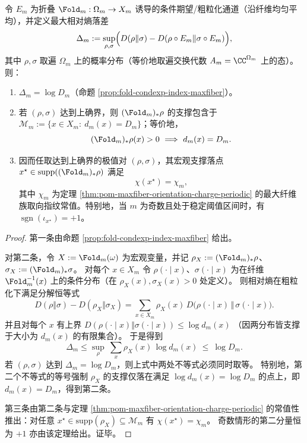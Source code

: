 \begin{theorem}\label{thm:fold-max-data-processing-saturation-chi}
令 \(E_m\) 为折叠 \(\Fold_m:\Omega_m\to X_m\) 诱导的条件期望/粗粒化通道（沿纤维均匀平均），并定义最大相对熵落差
\[
\Delta_m:=\sup_{\rho,\sigma}\Bigl(D(\rho\Vert\sigma)-D(\rho\circ E_m\Vert\sigma\circ E_m)\Bigr),
\]
其中 \(\rho,\sigma\) 取遍 \(\Omega_m\) 上的概率分布（等价地取遍交换代数 \(A_m=\CC^{\Omega_m}\) 上的态）。
则：
\begin{enumerate}
\normalfont
  \item \(\Delta_m=\log D_m\)（命题 \ref{prop:fold-condexp-index-maxfiber}）。
  \item 若 \((\rho,\sigma)\) 达到上确界，则 \((\Fold_m)_\ast\rho\) 的支撑包含于 \(\mathcal{M}_m:=\{x\in X_m:\ d_m(x)=D_m\}\)；等价地，
  \[
  (\Fold_m)_\ast\rho(x)>0\ \Longrightarrow\ d_m(x)=D_m.
  \]
  \item 因而任取达到上确界的极值对 \((\rho,\sigma)\)，其宏观支撑落点 \(x^\star\in \mathrm{supp}((\Fold_m)_\ast\rho)\) 满足
  \[
  \chi(x^\star)=\chi_m,
  \]
  其中 \(\chi_m\) 为定理 \ref{thm:pom-maxfiber-orientation-charge-periodic} 的最大纤维族取向指纹常值。特别地，当 \(m\) 为奇数且处于稳定阈值区间时，有 \(\operatorname{sgn}(\iota_{x^\star})=+1\)。
\end{enumerate}
\end{theorem}
\begin{proof}
第一条由命题 \ref{prop:fold-condexp-index-maxfiber} 给出。
\par
对第二条，令 \(X:=\Fold_m(\omega)\) 为宏观变量，并记 \(\rho_X:=(\Fold_m)_\ast\rho\)、\(\sigma_X:=(\Fold_m)_\ast\sigma\)。
对每个 \(x\in X_m\) 令 \(\rho(\cdot\mid x)\)、\(\sigma(\cdot\mid x)\) 为在纤维 \(\Fold_m^{-1}(x)\) 上的条件分布（在 \(\rho_X(x),\sigma_X(x)>0\) 处定义）。
则相对熵在粗粒化下满足分解恒等式
\[
D(\rho\Vert\sigma)-D(\rho_X\Vert\sigma_X)
=\sum_{x\in X_m}\rho_X(x)\,D\!\bigl(\rho(\cdot\mid x)\,\Vert\,\sigma(\cdot\mid x)\bigr).
\]
并且对每个 \(x\) 有上界
\(
D(\rho(\cdot\mid x)\Vert\sigma(\cdot\mid x))\le \log d_m(x)
\)
（因两分布皆支撑于大小为 \(d_m(x)\) 的有限集合）。
于是得到
\[
\Delta_m\le \sup_{\rho}\ \sum_{x}\rho_X(x)\,\log d_m(x)\ \le\ \log D_m.
\]
若 \((\rho,\sigma)\) 达到 \(\Delta_m=\log D_m\)，则上式中两处不等式必须同时取等。
特别地，第二个不等式的等号强制 \(\rho_X\) 的支撑仅落在满足 \(\log d_m(x)=\log D_m\) 的点上，即 \(d_m(x)=D_m\)，得到第二条。
\par
第三条由第二条与定理 \ref{thm:pom-maxfiber-orientation-charge-periodic} 的常值性推出：对任意 \(x^\star\in\mathrm{supp}(\rho_X)\subseteq\mathcal{M}_m\) 有 \(\chi(x^\star)=\chi_m\)。
奇数情形的第二分量恒为 \(+1\) 亦由该定理给出。证毕。
\end{proof}

